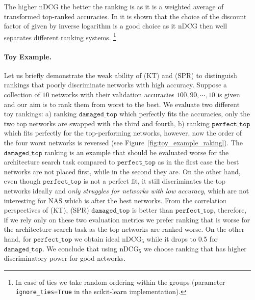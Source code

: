 The higher nDCG the better the ranking is as it is a weighted average of transformed top-ranked accuracies. In \cite{yining2013theoretical} it is shown that the choice of the discount factor of given by inverse logarithm is a good choice as it nDCG then well separates different ranking systems.
\footnote{In case of ties we take random ordering within the groups (parameter \texttt{ignore\_ties=True} in the scikit-learn implementation).}



\paragraph{Toy Example.} Let us briefly demonstrate the weak ability of (KT) and (SPR) to distinguish rankings that poorly discriminate networks with high accuracy. Suppose a collection of $10$ networks with their validation accuracies 
$100, 90, \cdots, 10$ is given and our aim is to rank them from worst to the best. We evaluate two different toy rankings: a) ranking $\texttt{damaged\_top}$ which perfectly fits the accuracies, only the two top networks are swapped with the third and fourth, b) ranking $\texttt{perfect\_top}$ which fits perfectly for the top-performing networks, however, now the order of the four worst networks is reversed (see Figure~\ref{fig:toy_example_raking}). The $\texttt{damaged\_top}$ ranking is an example that should be evaluated worse for the architecture search task compared to $\texttt{perfect\_top}$ as in the first case the best networks are not placed first, while in the second they are. On the other hand, even though $\texttt{perfect\_top}$ is not a perfect fit, it still discriminates the top networks ideally and o\textit{nly struggles for networks with low accuracy}, which are not interesting for NAS which is after the best networks. From the correlation perspectives of (KT), (SPR) $\texttt{damaged\_top}$ is better than $\texttt{perfect\_top}$, therefore, if we rely only on these two evaluation metrics we prefer ranking that is worse for the architecture search task as the top networks are ranked worse. On the other hand, for $\texttt{perfect\_top}$ we obtain ideal $\text{nDCG}_{5}$ while it drops to 0.5 for $\texttt{damaged\_top}$. We conclude that using $\text{nDCG}_{5}$ we choose ranking that has higher discriminatory power for good networks. 

